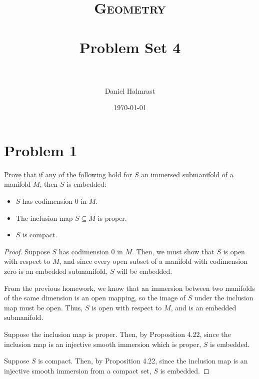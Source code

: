 \documentclass[fontsize=11pt]{scrartcl} %
\title{	
\normalfont \normalsize 
\textsc{Geometry} \\ [25pt] %
\horrule{0.5pt} \\[0.4cm] %
\huge Problem Set 4 \\ %
\horrule{2pt} \\[0.5cm] %
}
\author{Daniel Halmrast} %
\date{\normalsize\today} %
\numberwithin{equation}{section} %
\numberwithin{figure}{section} %
\numberwithin{table}{section} %
\begin{document}
\maketitle %

\section*{Problem 1} %
Prove that if any of the following hold for $S$ an immersed submanifold of a
manifold $M$, then $S$ is embedded:
\begin{itemize}
    \item $S$ has codimension $0$ in $M$.
    \item The inclusion map $S\subseteq M$ is proper.
    \item $S$ is compact.
\end{itemize}

\begin{proof}
    Suppose $S$ has codimension $0$ in $M$. Then, we must show that $S$ is open
    with respect to $M$, and since every open subset of a manifold with
    codimension zero is an embedded submanifold, $S$ will be embedded.

    From the previous homework, we know that an immersion between two manifolds
    of the same dimension is an open mapping, so the image of $S$ under the
    inclusion map must be open. Thus, $S$ is open with respect to $M$, and is an
    embedded submanifold.

    Suppose the inclusion map is proper. Then, by Proposition 4.22, since the
    inclusion map is an injective smooth immersion which is proper, $S$ is
    embedded.

    Suppose $S$ is compact. Then, by Proposition 4.22, since the inclusion map
    is an injective smooth immersion from a compact set, $S$ is embedded.
\end{proof}

\newpage
\end{document}
